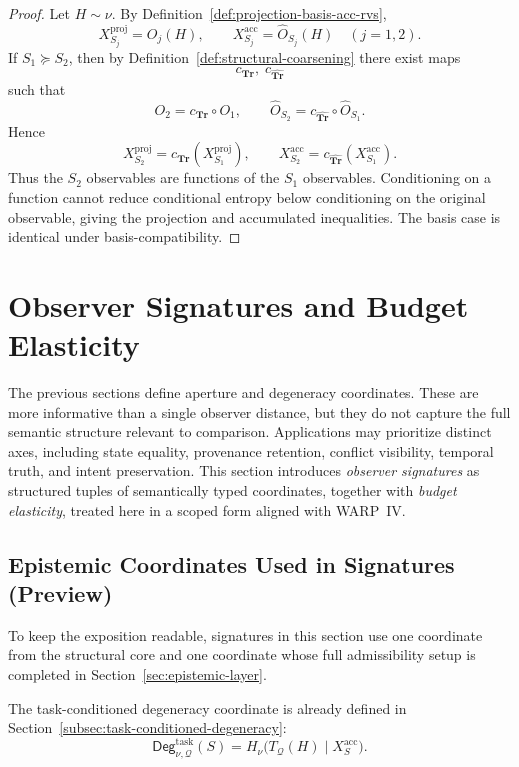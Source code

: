 \documentclass[11pt,twoside]{article}
\theoremstyle{definition}
\newcommand{\Tr}{\mathbf{Tr}}
\newcommand{\proj}{\mathrm{proj}}
\newcommand{\acc}{\mathrm{acc}}
\newcommand{\task}{\mathrm{task}}
\begin{document}
\begin{proof}
Let \(H\sim \nu\). By Definition~\ref{def:projection-basis-acc-rvs},
\[
  X_{S_j}^{\proj}=O_j(H),
  \qquad
  X_{S_j}^{\acc}=\widehat{O}_{S_j}(H)
  \quad (j=1,2).
\]
If \(S_1 \succeq S_2\), then by Definition~\ref{def:structural-coarsening} there exist maps
\[
  c_{\Tr},\; c_{\widehat{\Tr}}
\]
such that
\[
  O_2 = c_{\Tr}\circ O_1,
  \qquad
  \widehat{O}_{S_2}=c_{\widehat{\Tr}}\circ \widehat{O}_{S_1}.
\]
Hence
\[
  X_{S_2}^{\proj} = c_{\Tr}(X_{S_1}^{\proj}),
  \qquad
  X_{S_2}^{\acc} = c_{\widehat{\Tr}}(X_{S_1}^{\acc}).
\]
Thus the \(S_2\) observables are functions of the \(S_1\) observables. Conditioning on a function cannot reduce conditional entropy below conditioning on the original observable, giving the projection and accumulated inequalities. The basis case is identical under basis-compatibility.
\end{proof}

\section{Observer Signatures and Budget Elasticity}
\label{sec:signatures-elasticity}

The previous sections define aperture and degeneracy coordinates. These are more informative than a single observer distance, but they do not capture the full semantic structure relevant to comparison. Applications may prioritize distinct axes, including state equality, provenance retention, conflict visibility, temporal truth, and intent preservation. This section introduces \emph{observer signatures} as structured tuples of semantically typed coordinates, together with \emph{budget elasticity}, treated here in a scoped form aligned with WARP~IV.

\subsection{Epistemic Coordinates Used in Signatures (Preview)}
\label{subsec:signature-epistemic-preview}

To keep the exposition readable, signatures in this section use one coordinate from the structural core and one coordinate whose full admissibility setup is completed in Section~\ref{sec:epistemic-layer}.

The task-conditioned degeneracy coordinate is already defined in Section~\ref{subsec:task-conditioned-degeneracy}:
\[
  \mathsf{Deg}^{\task}_{\nu,\mathcal{Q}}(S)
  =
  H_\nu\!\bigl(T_{\mathcal{Q}}(H)\mid X_S^{\acc}\bigr).
\]
\end{document}
